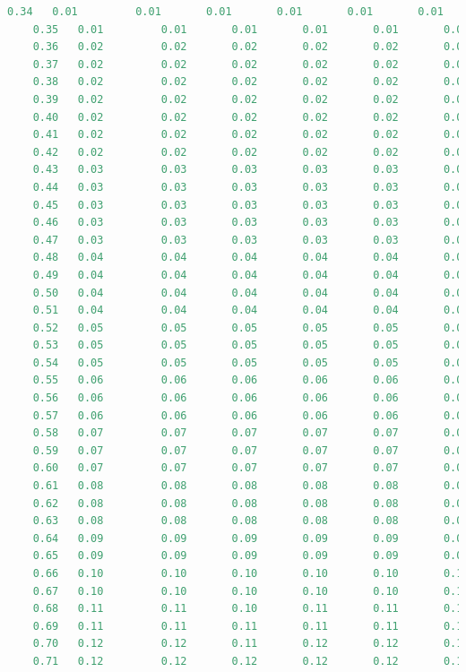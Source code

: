 \documentclass[12pt]{report}
\begin{document}
\begin{lstlisting}[language=Python]
	0.34   0.01         0.01       0.01       0.01       0.01       0.01
	0.35   0.01         0.01       0.01       0.01       0.01       0.01
	0.36   0.02         0.02       0.02       0.02       0.02       0.02
	0.37   0.02         0.02       0.02       0.02       0.02       0.02
	0.38   0.02         0.02       0.02       0.02       0.02       0.02
	0.39   0.02         0.02       0.02       0.02       0.02       0.02
	0.40   0.02         0.02       0.02       0.02       0.02       0.02
	0.41   0.02         0.02       0.02       0.02       0.02       0.02
	0.42   0.02         0.02       0.02       0.02       0.02       0.02
	0.43   0.03         0.03       0.03       0.03       0.03       0.03
	0.44   0.03         0.03       0.03       0.03       0.03       0.03
	0.45   0.03         0.03       0.03       0.03       0.03       0.03
	0.46   0.03         0.03       0.03       0.03       0.03       0.03
	0.47   0.03         0.03       0.03       0.03       0.03       0.03
	0.48   0.04         0.04       0.04       0.04       0.04       0.04
	0.49   0.04         0.04       0.04       0.04       0.04       0.04
	0.50   0.04         0.04       0.04       0.04       0.04       0.04
	0.51   0.04         0.04       0.04       0.04       0.04       0.04
	0.52   0.05         0.05       0.05       0.05       0.05       0.05
	0.53   0.05         0.05       0.05       0.05       0.05       0.05
	0.54   0.05         0.05       0.05       0.05       0.05       0.05
	0.55   0.06         0.06       0.06       0.06       0.06       0.06
	0.56   0.06         0.06       0.06       0.06       0.06       0.06
	0.57   0.06         0.06       0.06       0.06       0.06       0.06
	0.58   0.07         0.07       0.07       0.07       0.07       0.07
	0.59   0.07         0.07       0.07       0.07       0.07       0.07
	0.60   0.07         0.07       0.07       0.07       0.07       0.07
	0.61   0.08         0.08       0.08       0.08       0.08       0.08
	0.62   0.08         0.08       0.08       0.08       0.08       0.08
	0.63   0.08         0.08       0.08       0.08       0.08       0.08
	0.64   0.09         0.09       0.09       0.09       0.09       0.09
	0.65   0.09         0.09       0.09       0.09       0.09       0.09
	0.66   0.10         0.10       0.10       0.10       0.10       0.10
	0.67   0.10         0.10       0.10       0.10       0.10       0.10
	0.68   0.11         0.11       0.10       0.11       0.11       0.11
	0.69   0.11         0.11       0.11       0.11       0.11       0.11
	0.70   0.12         0.12       0.11       0.12       0.12       0.12
	0.71   0.12         0.12       0.12       0.12       0.12       0.12

\end{lstlisting}
\end{document}
